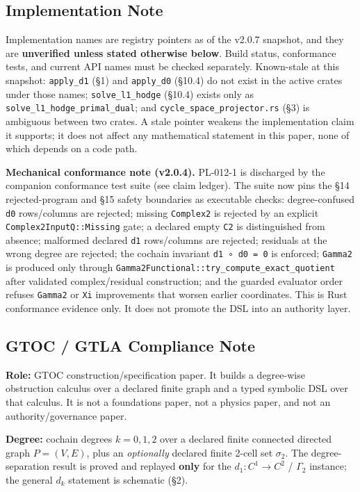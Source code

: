 \documentclass[
]{article}
\begin{document}
\subsection{Implementation Note}\label{implementation-note}

Implementation names are registry pointers as of the v2.0.7 snapshot, and they are \textbf{unverified unless stated otherwise below}. Build status, conformance tests, and current API names must be checked separately. Known-stale at this snapshot: \texttt{apply\_d1} (§1) and \texttt{apply\_d0} (§10.4) do not exist in the active crates under those names; \texttt{solve\_l1\_hodge} (§10.4) exists only as \texttt{solve\_l1\_hodge\_primal\_dual}; and \texttt{cycle\_space\_projector.rs} (§3) is ambiguous between two crates. A stale pointer weakens the implementation claim it supports; it does not affect any mathematical statement in this paper, none of which depends on a code path.

\textbf{Mechanical conformance note (v2.0.4).} PL-012-1 is discharged by the companion conformance test suite (see claim ledger). The suite now pins the §14 rejected-program and §15 safety boundaries as executable checks: degree-confused \texttt{d0} rows/columns are rejected; missing \texttt{Complex2} is rejected by an explicit \texttt{Complex2InputQ::Missing} gate; a declared empty \texttt{C2} is distinguished from absence; malformed declared \texttt{d1} rows/columns are rejected; residuals at the wrong degree are rejected; the cochain invariant \texttt{d1\ ∘\ d0\ =\ 0} is enforced; \texttt{Gamma2} is produced only through \texttt{Gamma2Functional::try\_compute\_exact\_quotient} after validated complex/residual construction; and the guarded evaluator order refuses \texttt{Gamma2} or \texttt{Xi} improvements that worsen earlier coordinates. This is Rust conformance evidence only. It does not promote the DSL into an authority layer.

\subsection{GTOC / GTLA Compliance Note}\label{gtoc-gtla-compliance-note}

\textbf{Role:} GTOC construction/specification paper. It builds a degree-wise obstruction calculus over a declared finite graph and a typed symbolic DSL over that calculus. It is not a foundations paper, not a physics paper, and not an authority/governance paper.

\textbf{Degree:} cochain degrees \(k=0,1,2\) over a declared finite connected directed graph \(P=(V,E)\), plus an \emph{optionally} declared finite 2-cell set \(\sigma_2\). The degree-separation result is proved and replayed \textbf{only} for the \(d_1:C^1\to C^2\) / \(\Gamma_2\) instance; the general \(d_k\) statement is schematic (§2).
\end{document}
